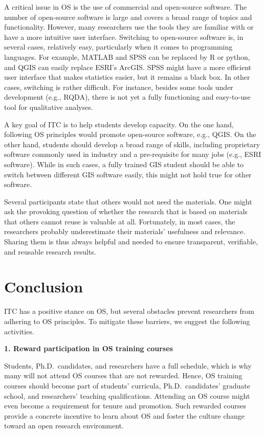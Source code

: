 \documentclass[gc, manuscript]{copernicus}
\begin{document}
A critical issue in OS is the use of commercial and open-source
software. The number of open-source software is large and covers a broad
range of topics and functionality. However, many researchers use the
tools they are familiar with or have a more intuitive user interface.
Switching to open-source software is, in several cases, relatively easy,
particularly when it comes to programming languages. For example, MATLAB
and SPSS can be replaced by R or python, and QGIS can easily replace
ESRI's ArcGIS. SPSS might have a more efficient user interface that
makes statistics easier, but it remains a black box. In other cases,
switching is rather difficult. For instance, besides some tools under
development (e.g., RQDA), there is not yet a fully functioning and
easy-to-use tool for qualitative analyses.

A key goal of ITC is to help students develop capacity. On the one hand,
following OS principles would promote open-source software, e.g., QGIS.
On the other hand, students should develop a broad range of skills,
including proprietary software commonly used in industry and a
pre-requisite for many jobs (e.g., ESRI software). While in such cases,
a fully trained GIS student should be able to switch between different
GIS software easily, this might not hold true for other software.

Several participants state that others would not need the materials. One
might ask the provoking question of whether the research that is based
on materials that others cannot reuse is valuable at all. Fortunately,
in most cases, the researchers probably underestimate their materials'
usefulness and relevance. Sharing them is thus always helpful and needed
to ensure transparent, verifiable, and reusable research results.

\section{Conclusion}

ITC has a positive stance on OS, but several obstacles prevent
researchers from adhering to OS principles. To mitigate these barriers,
we suggest the following activities.

\textbf{1. Reward participation in OS training courses}

Students, Ph.D.~candidates, and researchers have a full schedule, which
is why many will not attend OS courses that are not rewarded. Hence, OS
training courses should become part of students' curricula,
Ph.D.~candidates' graduate school, and researchers' teaching
qualifications. Attending an OS course might even become a requirement
for tenure and promotion. Such rewarded courses provide a concrete
incentive to learn about OS and foster the culture change toward an open
research environment.
\end{document}
